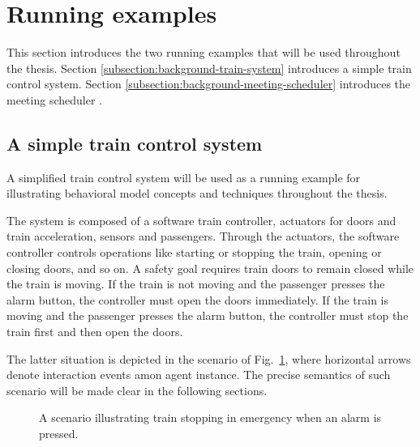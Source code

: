 \section{Running examples\label{section:background-running-examples}}

This section introduces the two running examples that will be used throughout the thesis. Section \ref{subsection:background-train-system} introduces a simple train control system. Section \ref{subsection:background-meeting-scheduler} introduces the meeting scheduler \cite{Feather:1997}.

\subsection{A simple train control system\label{subsection:background-train-system}}

A simplified train control system will be used as a running example for illustrating behavioral model concepts and techniques throughout the thesis. 

The system is composed of a software train controller, actuators for doors and train acceleration, sensors and passengers. Through the actuators, the software controller controls operations like starting or stopping the train, opening or closing doors, and so on. A safety goal requires train doors to remain closed while the train is moving. If the train is not moving and the passenger presses the alarm button, the controller must open the doors immediately. If the train is moving and the passenger presses the alarm button, the controller must stop the train first and then open the doors. 

The latter situation is depicted in the scenario of Fig.~\ref{image:train-scenario-all-agents}, where horizontal arrows denote interaction events amon agent instance. The precise semantics of such scenario will be made clear in the following sections.

\begin{figure}[H]\centering
{}
\caption{A scenario illustrating train stopping in emergency when an alarm is pressed.\label{image:train-scenario-all-agents}}
\end{figure}

